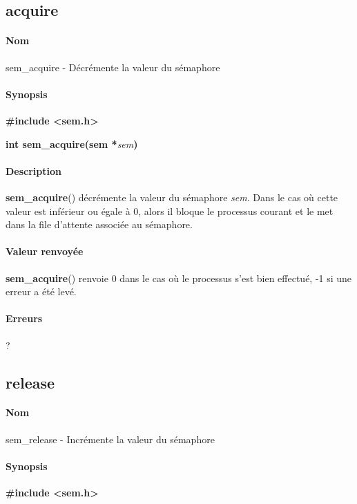 \documentclass[12pt]{article}
\begin{document}
    \subsection{acquire}
        \paragraph{Nom\\}
        sem\_acquire - Décrémente la valeur du sémaphore
        \paragraph{Synopsis\\}
        \textbf{\#include <sem.h>}

        \textbf{int sem\_acquire(sem *}\textit{sem}\textbf{)}
        \paragraph{Description\\}
        \textbf{sem\_acquire}() décrémente la valeur du sémaphore \textit{sem}. Dans le cas où cette valeur est inférieur ou égale à 0, alors il bloque le processus courant et le met dans la file d'attente associée au sémaphore.

        \paragraph{Valeur renvoyée\\}
        \textbf{sem\_acquire}() renvoie 0 dans le cas où le processus s'est bien effectué, -1 si une erreur a été levé.
        \paragraph{Erreurs\\}
        ?

    \newpage
    \subsection{release}
        \paragraph{Nom\\}
        sem\_release - Incrémente la valeur du sémaphore
        \paragraph{Synopsis\\}
        \textbf{\#include <sem.h>}
\end{document}
